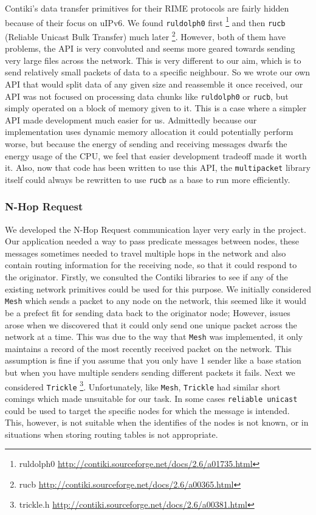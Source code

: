 Contiki's data transfer primitives for their RIME protocols are fairly hidden because of their focus on uIPv6. We found \verb|ruldolph0| first \footnote{ruldolph0 \url{http://contiki.sourceforge.net/docs/2.6/a01735.html}} and then \verb|rucb| (Reliable Unicast Bulk Transfer) much later \footnote{rucb \url{http://contiki.sourceforge.net/docs/2.6/a00365.html}}. However, both of them have problems, the API is very convoluted and seems more geared towards sending very large files across the network. This is very different to our aim, which is to send relatively small packets of data to a specific neighbour. So we wrote our own API that would split data of any given size and reassemble it once received, our API was not focused on processing data chunks like \verb|ruldolph0| or \verb|rucb|, but simply operated on a block of memory given to it. This is a case where a simpler API made development much easier for us. Admittedly because our implementation uses dynamic memory allocation it could potentially perform worse, but because the energy of sending and receiving messages dwarfs the energy usage of the CPU, we feel that easier development tradeoff made it worth it. Also, now that code has been written to use this API, the \verb|multipacket| library itself could always be rewritten to use \verb|rucb| as a base to run more efficiently.

\subsubsection{N-Hop Request} 

We developed the N-Hop Request communication layer very early in the project. Our application needed a way to pass predicate messages between nodes, these messages sometimes needed to travel multiple hops in the network and also contain routing information for the receiving node, so that it could respond to the originator. Firstly, we consulted the Contiki libraries to see if any of the existing network primitives could be used for this purpose. We initially considered \verb|Mesh| which sends a packet to any node on the network, this seemed like it would be a prefect fit for sending data back to the originator node; However, issues arose when we discovered that it could only send one unique packet across the network at a time. This was due to the way that \verb|Mesh| was implemented, it only maintains a record of the most recently received packet on the network. This assumption is fine if you assume that you only have 1 sender like a base station but when you have multiple senders sending different packets it fails. Next we considered \verb|Trickle| \footnote{trickle.h \url{http://contiki.sourceforge.net/docs/2.6/a00381.html}}. Unfortunately, like \verb|Mesh|, \verb|Trickle| had similar short comings which made unsuitable for our task. In some cases \verb|reliable unicast| could be used to target the specific nodes for which the message is intended. This, however, is not suitable when the identifies of the nodes is not known, or in situations when storing routing tables is not appropriate. 

